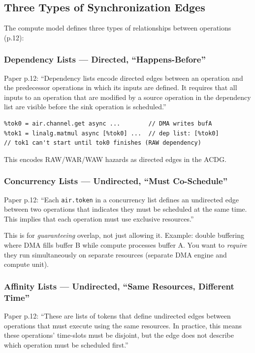 \documentclass[11pt,a4paper]{article}
\begin{document}
\subsection{Three Types of Synchronization Edges}

The compute model defines three types of relationships between operations (p.12):

\subsubsection{Dependency Lists --- Directed, ``Happens-Before''}

Paper p.12: ``Dependency lists encode directed edges between an operation and the
predecessor operations in which its inputs are defined. It requires that all inputs
to an operation that are modified by a source operation in the dependency list are
visible before the sink operation is scheduled.''

\begin{lstlisting}
%tok0 = air.channel.get async ...        // DMA writes bufA
%tok1 = linalg.matmul async [%tok0] ...  // dep list: [%tok0]
// tok1 can't start until tok0 finishes (RAW dependency)
\end{lstlisting}

This encodes RAW/WAR/WAW hazards as directed edges in the ACDG.

\subsubsection{Concurrency Lists --- Undirected, ``Must Co-Schedule''}

Paper p.12: ``Each \texttt{air.token} in a concurrency list defines an undirected
edge between two operations that indicates they must be scheduled at the same time.
This implies that each operation must use exclusive resources.''

This is for \emph{guaranteeing} overlap, not just allowing it. Example: double
buffering where DMA fills buffer B while compute processes buffer A. You want to
\emph{require} they run simultaneously on separate resources (separate DMA engine
and compute unit).

\subsubsection{Affinity Lists --- Undirected, ``Same Resources, Different Time''}

Paper p.12: ``These are lists of tokens that define undirected edges between
operations that must execute using the same resources. In practice, this means
these operations' time-slots must be disjoint, but the edge does not describe
which operation must be scheduled first.''
\end{document}
